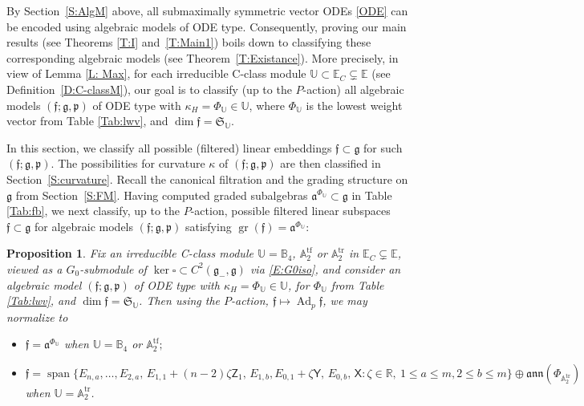 \documentclass[pdftex]{sigma}%
\DeclareMathOperator{\gr}{gr}
\DeclareMathOperator{\tf}{tf}
\DeclareMathOperator{\tr}{tr}
\DeclareMathOperator{\sn}{span}
\newcommand{\g}{\mathfrak{g}}
\newcommand\Ad{\operatorname{Ad}}
\renewcommand\gr{\operatorname{gr}}
\newcommand\fa{\mathfrak{a}}
\newcommand\fann{\mathfrak{ann}}
\newcommand\ff{\mathfrak{f}}
\newcommand\fg{\mathfrak{g}}
\newcommand\fp{\mathfrak{p}}
\newcommand\fS{\mathfrak{S}}
\newcommand{\R}{\mathbb{R}}
\newcommand\bbE{\mathbb{E}}
\newcommand\bbU{\mathbb{U}}
\newcommand\bbA{\mathbb{A}}
\newcommand\bbB{\mathbb{B}}
\newcommand\sfX{\mathsf{X}}
\newcommand\sfY{\mathsf{Y}}
\newcommand\sfZ{\mathsf{Z}}
\numberwithin{equation}{section}
\newtheorem{Proposition}[Theorem]{Proposition}
 { \theoremstyle{definition}
\newtheorem{Definition}[Theorem]{Definition}
\newtheorem{Note}[Theorem]{Note}
\newtheorem{Example}[Theorem]{Example}
\newtheorem{Remark}[Theorem]{Remark} }
\begin{document}
By Section~\ref{S:AlgM} above, all submaximally symmetric vector ODEs \eqref{ODE} can be encoded using algebraic models of ODE type. Consequently, proving our main results (see Theorems \ref{T:I} and~\ref{T:Main1}) boils down to classifying these corresponding algebraic models (see Theorem~\ref{T:Existance}). More precisely, in view of Lemma \ref{L: Max}, for each irreducible C-class module $\bbU \subset \bbE_C \subsetneq \bbE$ (see Definition~\ref{D:C-classM}), our goal is to classify (up to the $P$-action) all algebraic models $(\ff;\fg,\fp)$ of ODE type with $\kappa_H = \Phi_\bbU \in \bbU$, where $\Phi_\bbU$ is the lowest weight vector from Table \ref{Tab:lwv}, and $\dim \ff = \fS_\bbU$.

In this section, we classify all possible (filtered) linear embeddings $\ff \subset \fg$ for such $(\ff;\fg,\fp)$. The possibilities for curvature $\kappa$ of $(\ff;\fg,\fp)$ are then classified in Section~\ref{S:curvature}. Recall the canonical filtration and the grading structure on $\g$ from Section~\ref{S:FM}. Having computed graded subalgebras $\fa^{\Phi_\bbU} \subset \g$ in Table \ref{Tab:fb}, we next classify, up to the $P$-action, possible filtered linear subspaces $\ff \subset \g$ for algebraic models $(\ff;\fg,\fp)$ satisfying $\gr(\ff) = \fa^{\Phi_\bbU}$:

\begin{Proposition} \label{P:DR}
Fix an irreducible C-class module $\bbU = \bbB_4$, $\bbA_2^{\tf}$ or $\bbA_2^{\tr}$ in $\bbE_C \subsetneq \bbE$, viewed as a $G_0$-submodule of $\ker\square \subset C^2(\fg_-,\fg)$ via \eqref{E:G0iso}, and consider an algebraic model $(\ff;\fg,\fp)$ of ODE type with $ \kappa_H = \Phi_{\bbU}\in \bbU$, for $\Phi_\bbU$ from Table {\rm \ref{Tab:lwv}}, and $\dim \ff = \fS_{\bbU}$. Then using the $P$-action, $\ff \mapsto \Ad_p \ff$, we may normalize to
\begin{itemize}\itemsep=0pt
\item[$(a)$] $\ff = \fa^{\Phi_{\bbU}}$ when $\bbU = \bbB_4$ or $\bbA_2^{\tf};$
\item [$(b)$] $\ff = \sn\{E_{n,a}, \dots, E_{2,a},\, E_{1,1}+(n-2)\zeta\sfZ_1, \, E_{1,b}, E_{0,1}+\zeta\sfY,\, E_{0,b}, \, \sfX\colon \zeta \in \R,\ 1\le a \le m, \allowbreak 2 \le b \le m \} \oplus \fann (\Phi_{\bbA_2^{\tr}})$ when $\bbU = \bbA_2^{\tr}$.
\end{itemize}	
\end{Proposition}
\end{document}
